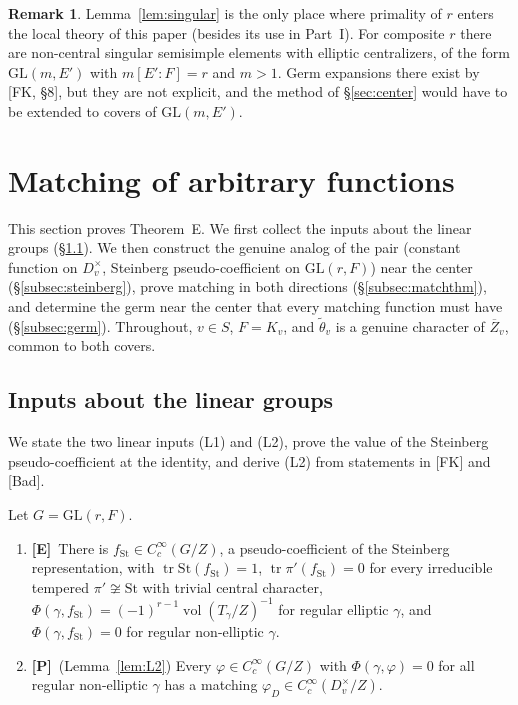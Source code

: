 \documentclass[12pt]{article}
\newcommand{\ov}[1]{\overline{#1}}
\newcommand{\tr}{\operatorname{tr}}
\newcommand{\vol}{\operatorname{vol}}
\newcommand{\GL}{\mathrm{GL}}
\newcommand{\St}{\mathrm{St}}
\newcommand{\Zb}{\ov{Z}}
\newcommand{\Pv}{\textbf{[P]}}
\newcommand{\Ev}{\textbf{[E]}}
\theoremstyle{plain}
\theoremstyle{definition}
\newtheorem{remark}[theorem]{Remark}
\begin{document}
\begin{remark}
Lemma~\ref{lem:singular} is the only place where primality of $r$ enters the local theory of this paper (besides its use in Part~I). For composite $r$ there are non-central singular semisimple elements with elliptic centralizers, of the form $\GL(m,E')$ with $m[E':F]=r$ and $m>1$. Germ expansions there exist by [FK, \S8], but they are not explicit, and the method of \S\ref{sec:center} would have to be extended to covers of $\GL(m,E')$.
\end{remark}

\section{Matching of arbitrary functions}\label{sec:matching}
This section proves Theorem~E. We first collect the inputs about the linear groups (\S\ref{subsec:linear}). We then construct the genuine analog of the pair (constant function on $D_v^\times$, Steinberg pseudo-coefficient on $\GL(r,F)$) near the center (\S\ref{subsec:steinberg}), prove matching in both directions (\S\ref{subsec:matchthm}), and determine the germ near the center that every matching function must have (\S\ref{subsec:germ}). Throughout, $v\in S$, $F=K_v$, and $\tilde\theta_v$ is a genuine character of $\Zb_v$, common to both covers.

\subsection{Inputs about the linear groups}\label{subsec:linear}
We state the two linear inputs (L1) and (L2), prove the value of the Steinberg pseudo-coefficient at the identity, and derive (L2) from statements in [FK] and [Bad].

Let $G=\GL(r,F)$.
\begin{enumerate}[label=(L\arabic*)]
\item \Ev\ There is $f_{\St}\in C_c^\infty(G/Z)$, a pseudo-coefficient of the Steinberg representation, with $\tr\St(f_{\St})=1$, $\tr\pi'(f_{\St})=0$ for every irreducible tempered $\pi'\not\cong\St$ with trivial central character, $\Phi(\gamma,f_{\St})=(-1)^{r-1}\vol(T_\gamma/Z)^{-1}$ for regular elliptic $\gamma$, and $\Phi(\gamma,f_{\St})=0$ for regular non-elliptic $\gamma$.
\item \Pv\ (Lemma~\ref{lem:L2}) Every $\varphi\in C_c^\infty(G/Z)$ with $\Phi(\gamma,\varphi)=0$ for all regular non-elliptic $\gamma$ has a matching $\varphi_D\in C_c^\infty(D_v^\times/Z)$.
\end{enumerate}
\end{document}
